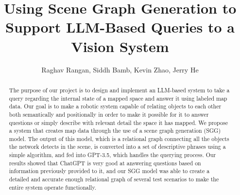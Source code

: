 \documentclass[letterpaper, 10 pt, conference]{ieeeconf}  %
\title{\LARGE \bf
Using Scene Graph Generation to Support LLM-Based Queries to a Vision System}
\author{Raghav Rangan, Siddh Bamb, Kevin Zhao, Jerry He%
}
\begin{document}
\maketitle
\thispagestyle{empty}
\pagestyle{empty}


\begin{abstract}
    The purpose of our project is to design and implement an LLM-based system to take a query regarding the internal state of a mapped space and answer it using labeled map data. Our goal is to make a robotic system capable of relating objects to each other both semantically and positionally in order to make it possible for it to answer questions or simply describe with relevant detail the space it has mapped. We propose a system that creates map data through the use of a scene graph generation (SGG) model. The output of this model, which is a relational graph connecting all the objects the network detects in the scene, is converted into a set of descriptive phrases using a simple algorithm, and fed into GPT-3.5, which handles the querying process. Our results showed that ChatGPT is very good at answering questions based on information previously provided to it, and our SGG model was able to create a detailed and accurate enough relational graph of several test scenarios to make the entire system operate functionally.
\end{abstract}
    
\end{document}
